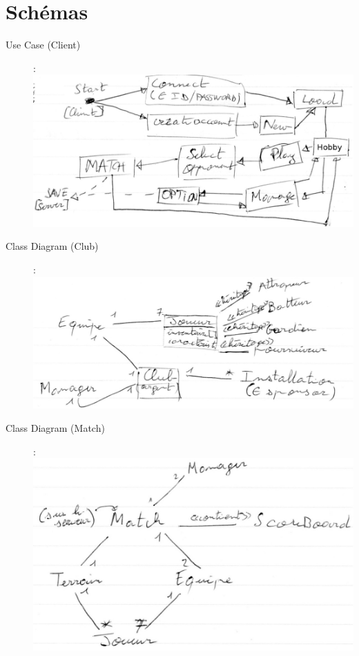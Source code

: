 \documentclass[a4paper,10pt]{article}
\begin{document}
\part*{Schémas}
\begin{description}
\item[\LARGE Use Case (Client)] :\\
\includegraphics[scale=1]{schema1_pv1.jpg}
\item[\LARGE Class Diagram (Club)] :\\
\includegraphics[scale=1]{schema2_pv1.jpg}
\newpage
\item[\LARGE Class Diagram (Match)] :\\
\includegraphics[scale=1]{schema3_pv1.jpg}
\end{description}
\end{document}
